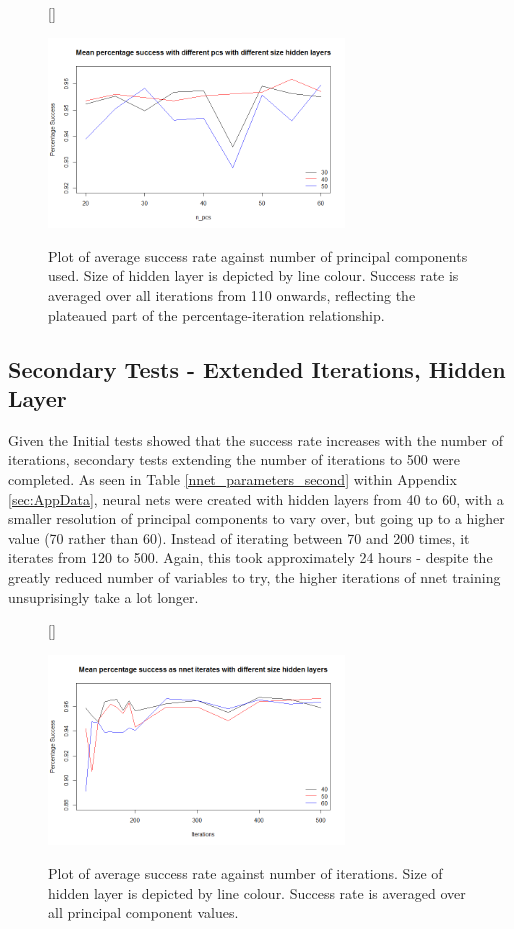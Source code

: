 \documentclass[11pt]{article} %
\begin{document}
\begin{figure}[htb!]
[\FBwidth]
{\caption{Plot of average success rate against number of principal components used. Size of hidden layer is depicted by line colour. Success rate is averaged over all iterations from 110 onwards, reflecting the plateaued part of the percentage-iteration relationship.}\label{fig:long_mean_pc_nnet}}
{\includegraphics[width=0.7\textwidth]{long_mean_pcs_cutdown.png}}
\end{figure}

\subsection{Secondary Tests - Extended Iterations, Hidden Layer}

Given the Initial tests showed that the success rate increases with the number of iterations, secondary tests extending the number of iterations to 500 were completed. As seen in Table \ref{nnet_parameters_second} within Appendix \ref{sec:AppData}, neural nets were created with hidden layers from 40 to 60, with a smaller resolution of principal components to vary over, but going up to a higher value (70 rather than 60). Instead of iterating between 70 and 200 times, it iterates from 120 to 500. Again, this took approximately 24 hours - despite the greatly reduced number of variables to try, the higher iterations of nnet training unsuprisingly take a lot longer.

\begin{figure}[htb!]
[\FBwidth]
{\caption{Plot of average success rate against number of iterations. Size of hidden layer is depicted by line colour. Success rate is averaged over all principal component values. }\label{fig:ext_mean_nnet}}
{\includegraphics[width=0.7\textwidth]{nnet_extend_iter_mean.png}}
\end{figure}
\end{document}
